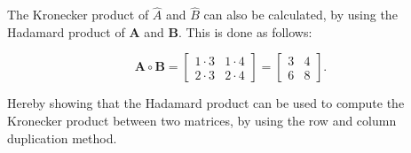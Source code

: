 The Kronecker product of $\hat{A}$ and $\hat{B}$ can also be calculated, by using the Hadamard product of $\mathbf{A}$ and $\mathbf{B}$.
This is done as follows:

\begin{equation}
      \mathbf{A} \circ \mathbf{B} = \begin{bmatrix}
            1 \cdot 3 & 1 \cdot 4 \\
            2 \cdot 3 & 2 \cdot 4
      \end{bmatrix} = \begin{bmatrix}
            3 & 4 \\
            6 & 8
      \end{bmatrix}.
\end{equation}

Hereby showing that the Hadamard product can be used to compute the Kronecker product between two matrices, by using the row and column duplication method.

